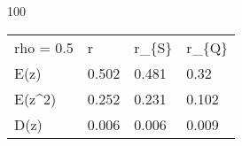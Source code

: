 
100
\begin{tabular}{llll}
\hline
 rho = 0.5 & r     & r\_\{S\} & r\_\{Q\} \\
 E(z)      & 0.502 & 0.481 & 0.32  \\
 E(z\^{}2)    & 0.252 & 0.231 & 0.102 \\
 D(z)      & 0.006 & 0.006 & 0.009 \\
\hline
\end{tabular}